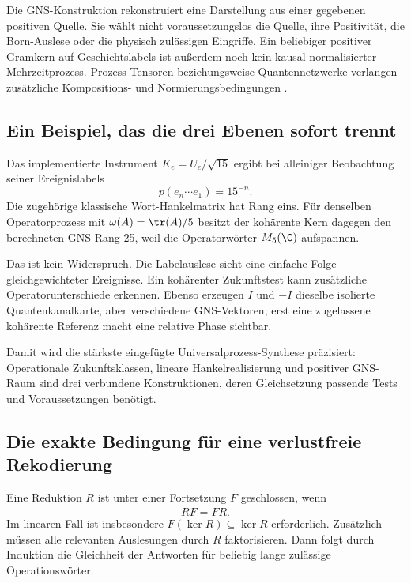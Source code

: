 Die GNS-Konstruktion rekonstruiert eine Darstellung aus einer gegebenen positiven Quelle. Sie wählt nicht voraussetzungslos die Quelle, ihre Positivität, die Born-Auslese oder die physisch zulässigen Eingriffe. Ein beliebiger positiver Gramkern auf Geschichtslabels ist außerdem noch kein kausal normalisierter Mehrzeitprozess. Prozess-Tensoren beziehungsweise Quantennetzwerke verlangen zusätzliche Kompositions- und Normierungsbedingungen \cite{combs}.

\subsection{Ein Beispiel, das die drei Ebenen sofort trennt}
Das implementierte Instrument $K_e=U_e/\sqrt{15}$ ergibt bei alleiniger Beobachtung seiner Ereignislabels
\begin{equation}
p(e_n\cdots e_1)=15^{-n}.
\end{equation}
Die zugehörige klassische Wort-Hankelmatrix hat Rang eins. Für denselben Operatorprozess mit $\omega(A)=\tr(A)/5$ besitzt der kohärente Kern dagegen den berechneten GNS-Rang 25, weil die Operatorwörter $M_5(\C)$ aufspannen.

Das ist kein Widerspruch. Die Labelauslese sieht eine einfache Folge gleichgewichteter Ereignisse. Ein kohärenter Zukunftstest kann zusätzliche Operatorunterschiede erkennen. Ebenso erzeugen $I$ und $-I$ dieselbe isolierte Quantenkanalkarte, aber verschiedene GNS-Vektoren; erst eine zugelassene kohärente Referenz macht eine relative Phase sichtbar.

Damit wird die stärkste eingefügte Universalprozess-Synthese präzisiert: Operationale Zukunftsklassen, lineare Hankelrealisierung und positiver GNS-Raum sind drei verbundene Konstruktionen, deren Gleichsetzung passende Tests und Voraussetzungen benötigt.

\subsection{Die exakte Bedingung für eine verlustfreie Rekodierung}
Eine Reduktion $R$ ist unter einer Fortsetzung $F$ geschlossen, wenn
\begin{equation}\label{eq:quotient}
RF=\overline F R.
\end{equation}
Im linearen Fall ist insbesondere $F(\ker R)\subseteq\ker R$ erforderlich. Zusätzlich müssen alle relevanten Auslesungen durch $R$ faktorisieren. Dann folgt durch Induktion die Gleichheit der Antworten für beliebig lange zulässige Operationswörter.

